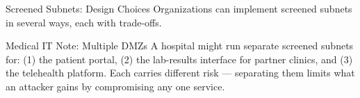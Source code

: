 \documentclass[aspectratio=169]{beamer}  %
\begin{document}
\begin{frame}{Screened Subnets: Design Choices}
    \footnotesize
    Organizations can implement screened subnets in several ways, each with trade-offs.

    \vspace{0.3em}
    \begin{table}[]
        \renewcommand{\arraystretch}{1.3}
        \centering
        \scriptsize
    \end{table}

    \vspace{0.3em}
    \begin{exampleblock}{Medical IT Note: Multiple DMZs}
        \footnotesize
        A hospital might run separate screened subnets for: (1) the patient portal, (2) the lab-results interface for partner clinics, and (3) the telehealth platform. Each carries different risk --- separating them limits what an attacker gains by compromising any one service.
    \end{exampleblock}
\end{frame}
\end{document}
